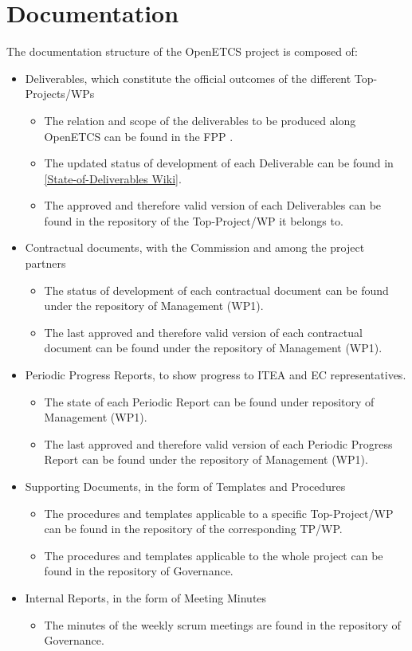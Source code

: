 \documentclass{template/openetcs_article}
\begin{document}
\section{Documentation}

The documentation structure of the OpenETCS project is composed of:
\begin{itemize}
\item Deliverables, which constitute the official outcomes of the different Top-Projects/WPs
\begin{itemize}
\item The relation and scope of the deliverables to be produced along OpenETCS can be found in the FPP \citep{fpp}.
\item The updated status of development of each Deliverable can be found in 
\href{https://github.com/openETCS/management/wiki/State-of-Deliverables}{[State-of-Deliverables Wiki]}.
\item The approved and therefore valid version of each Deliverables can be found in the repository of the Top-Project/WP it belongs to. 
\end{itemize}
\item Contractual documents, with the Commission and among the project partners
\begin{itemize}
\item The status of development of each contractual document can be found under the repository of Management (WP1).
\item The last approved and therefore valid version of each contractual document can be found under the repository of Management (WP1).
\end{itemize}
\item Periodic Progress Reports, to show progress to ITEA and EC representatives.
\begin{itemize}
\item The state of each Periodic Report can be found under repository of Management (WP1).
\item The last approved and therefore valid version of each Periodic Progress Report can be found under the repository of Management (WP1). 
\end{itemize}
\item Supporting Documents, in the form of Templates and Procedures
\begin{itemize}
\item The procedures and templates applicable to a specific Top-Project/WP can be found in the repository of the corresponding TP/WP.
\item The procedures and templates applicable to the whole project can be found in the repository of Governance.
\end{itemize}
\item Internal Reports, in the form of Meeting Minutes
\begin{itemize}
\item The minutes of the weekly scrum meetings are found in the repository of Governance.
\end{itemize}
\end{itemize}
\end{document}
